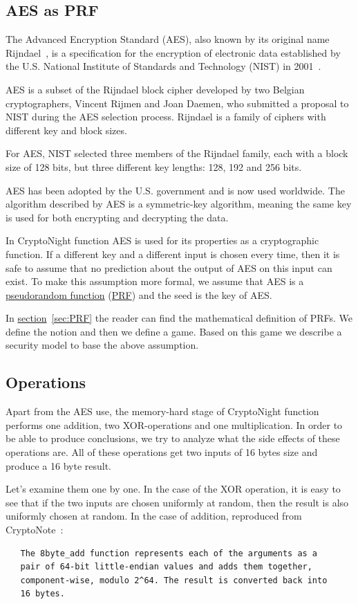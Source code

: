 \subsection{AES as PRF}
The Advanced Encryption Standard (AES), also known by its original name Rijndael~\cite{Daemen99aesproposal:}, is a specification for the encryption of electronic data established by the U.S. National Institute of Standards and Technology (NIST) in 2001~\cite{nla.cat-vn4183631}.

AES is a subset of the Rijndael block cipher developed by two Belgian cryptographers, Vincent Rijmen and Joan Daemen, who submitted a proposal to NIST during the AES selection process. Rijndael is a family of ciphers with different key and block sizes.

For AES, NIST selected three members of the Rijndael family, each with a block size of 128 bits, but three different key lengths: 128, 192 and 256 bits.

AES has been adopted by the U.S. government and is now used worldwide. The algorithm described by AES is a symmetric-key algorithm, meaning the same key is used for both encrypting and decrypting the data.

In CryptoNight function AES is used for its properties as a cryptographic function. If a different key and a different input is chosen every time, then it is safe to assume that no prediction about the output of AES on this input can exist. To make this assumption more formal, we assume that AES is a \hyperref[sec:PRF]{pseudorandom function} (\hyperref[sec:PRF]{PRF}) and the seed is the key of AES.

In \hyperref[sec:PRF]{section}~\ref{sec:PRF} the reader can find the mathematical definition of PRFs. We define the notion and then we define a game. Based on this game we describe a security model to base the above assumption.

\subsection{Operations} \label{sec:operations}
Apart from the AES use, the memory-hard stage of CryptoNight function performs one addition, two XOR-operations and one multiplication. In order to be able to produce conclusions, we try to analyze what the side effects of these operations are. All of these operations get two inputs of 16 bytes size and produce a 16 byte result.

Let's examine them one by one. In the case of the XOR operation, it is easy to see that if the two inputs are chosen uniformly at random, then the result is also uniformly chosen at random. In the case of addition, reproduced from CryptoNote~\cite{cryptonight}:
\begin{verbatim}
   The 8byte_add function represents each of the arguments as a
   pair of 64-bit little-endian values and adds them together,
   component-wise, modulo 2^64. The result is converted back into
   16 bytes.
\end{verbatim}

